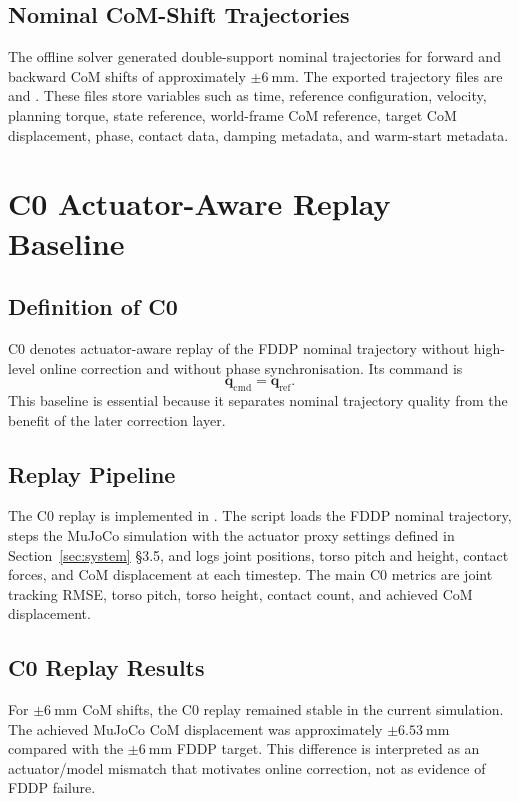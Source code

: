 \documentclass[12pt,a4paper]{report}
\begin{document}
\subsection{Nominal CoM-Shift Trajectories}
The offline solver generated double-support nominal trajectories for forward and backward CoM shifts of approximately $\pm\SI{6}{\milli\metre}$. The exported trajectory files are  and . These files store variables such as time, reference configuration, velocity, planning torque, state reference, world-frame CoM reference, target CoM displacement, phase, contact data, damping metadata, and warm-start metadata.
 
\section{C0 Actuator-Aware Replay Baseline}\label{sec:c0_baseline}
 
\subsection{Definition of C0}
C0 denotes actuator-aware replay of the FDDP nominal trajectory without high-level online correction and without phase synchronisation. Its command is
\begin{equation}
    \mathbf{q}_{\mathrm{cmd}} = \mathbf{q}_{\mathrm{ref}}.
\end{equation}
This baseline is essential because it separates nominal trajectory quality from the benefit of the later correction layer.
 
\subsection{Replay Pipeline}
The C0 replay is implemented in . The script loads the FDDP nominal trajectory, steps the MuJoCo simulation with the actuator proxy settings defined in Section~\ref{sec:system} \S 3.5, and logs joint positions, torso pitch and height, contact forces, and CoM displacement at each timestep. The main C0 metrics are joint tracking RMSE, torso pitch, torso height, contact count, and achieved CoM displacement.
 
\subsection{C0 Replay Results}
For $\pm\SI{6}{\milli\metre}$ CoM shifts, the C0 replay remained stable in the current simulation. The achieved MuJoCo CoM displacement was approximately $\pm\SI{6.53}{\milli\metre}$ compared with the $\pm\SI{6}{\milli\metre}$ FDDP target. This difference is interpreted as an actuator/model mismatch that motivates online correction, not as evidence of FDDP failure.
 
\end{document}
